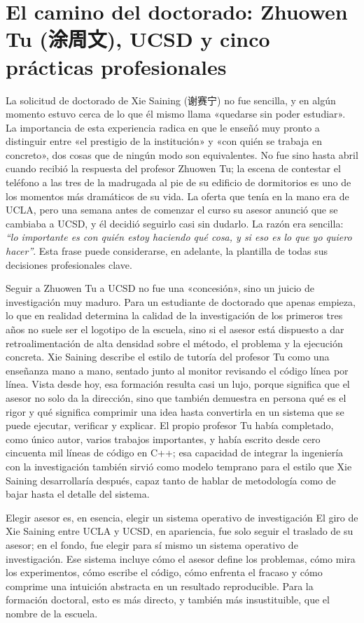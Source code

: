 \section{El camino del doctorado: Zhuowen Tu (涂周文), UCSD y cinco prácticas profesionales}

La solicitud de doctorado de Xie Saining (谢赛宁) no fue sencilla, y en algún momento estuvo cerca de lo que él mismo llama «quedarse sin poder estudiar». La importancia de esta experiencia radica en que le enseñó muy pronto a distinguir entre «el prestigio de la institución» y «con quién se trabaja en concreto», dos cosas que de ningún modo son equivalentes. No fue sino hasta abril cuando recibió la respuesta del profesor Zhuowen Tu; la escena de contestar el teléfono a las tres de la madrugada al pie de su edificio de dormitorios es uno de los momentos más dramáticos de su vida. La oferta que tenía en la mano era de UCLA, pero una semana antes de comenzar el curso su asesor anunció que se cambiaba a UCSD, y él decidió seguirlo casi sin dudarlo. La razón era sencilla: \textit{``lo importante es con quién estoy haciendo qué cosa, y si eso es lo que yo quiero hacer''}. Esta frase puede considerarse, en adelante, la plantilla de todas sus decisiones profesionales clave.

Seguir a Zhuowen Tu a UCSD no fue una «concesión», sino un juicio de investigación muy maduro. Para un estudiante de doctorado que apenas empieza, lo que en realidad determina la calidad de la investigación de los primeros tres años no suele ser el logotipo de la escuela, sino si el asesor está dispuesto a dar retroalimentación de alta densidad sobre el método, el problema y la ejecución concreta. Xie Saining describe el estilo de tutoría del profesor Tu como una enseñanza mano a mano, sentado junto al monitor revisando el código línea por línea. Vista desde hoy, esa formación resulta casi un lujo, porque significa que el asesor no solo da la dirección, sino que también demuestra en persona qué es el rigor y qué significa comprimir una idea hasta convertirla en un sistema que se puede ejecutar, verificar y explicar. El propio profesor Tu había completado, como único autor, varios trabajos importantes, y había escrito desde cero cincuenta mil líneas de código en C++; esa capacidad de integrar la ingeniería con la investigación también sirvió como modelo temprano para el estilo que Xie Saining desarrollaría después, capaz tanto de hablar de metodología como de bajar hasta el detalle del sistema.

\begin{importantbox}{Elegir asesor es, en esencia, elegir un sistema operativo de investigación}
El giro de Xie Saining entre UCLA y UCSD, en apariencia, fue solo seguir el traslado de su asesor; en el fondo, fue elegir para sí mismo un sistema operativo de investigación. Ese sistema incluye cómo el asesor define los problemas, cómo mira los experimentos, cómo escribe el código, cómo enfrenta el fracaso y cómo comprime una intuición abstracta en un resultado reproducible. Para la formación doctoral, esto es más directo, y también más insustituible, que el nombre de la escuela.
\end{importantbox}

